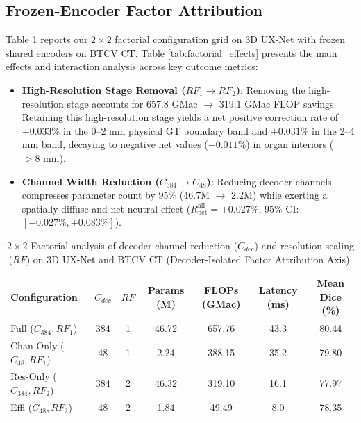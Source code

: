 \subsection{Frozen-Encoder Factor Attribution}
\label{sec:results_factorial}

Table \ref{tab:factorial} reports our $2\times2$ factorial configuration grid on 3D UX-Net with frozen shared encoders on BTCV CT. Table \ref{tab:factorial_effects} presents the main effects and interaction analysis across key outcome metrics:
\begin{itemize}
    \item \textbf{High-Resolution Stage Removal ($RF_1 \rightarrow RF_2$)}: Removing the high-resolution stage accounts for 657.8 GMac $\rightarrow$ 319.1 GMac FLOP savings. Retaining this high-resolution stage yields a net positive correction rate of $+0.033\%$ in the 0--2 mm physical GT boundary band and $+0.031\%$ in the 2--4 mm band, decaying to negative net values ($-0.011\%$) in organ interiors ($>8\text{ mm}$).
    \item \textbf{Channel Width Reduction ($C_{384} \rightarrow C_{48}$)}: Reducing decoder channels compresses parameter count by $95\%$ (46.7M $\rightarrow$ 2.2M) while exerting a spatially diffuse and net-neutral effect ($R_{\text{net}}^{\text{all}} = +0.027\%$, 95\% CI: $[-0.027\%, +0.083\%]$).
\end{itemize}

\begin{table}[t]
\centering
\caption{$2\times2$ Factorial analysis of decoder channel reduction ($C_{dec}$) and resolution scaling ($RF$) on 3D UX-Net and BTCV CT (Decoder-Isolated Factor Attribution Axis).}
\label{tab:factorial}
\small
\begin{tabular*}{\textwidth}{@{\extracolsep{\fill}}lcccccc}
\toprule
\textbf{Configuration} & $C_{dec}$ & $RF$ & \textbf{Params (M)} & \textbf{FLOPs (GMac)} & \textbf{Latency (ms)} & \textbf{Mean Dice (\%)} \\
\midrule
Full ($C_{384}, RF_1$) & 384 & 1 & 46.72 & 657.76 & 43.3 & 80.44 \\
Chan-Only ($C_{48}, RF_1$) & 48 & 1 & 2.24 & 388.15 & 35.2 & 79.80 \\
Res-Only ($C_{384}, RF_2$) & 384 & 2 & 46.32 & 319.10 & 16.1 & 77.97 \\
Effi ($C_{48}, RF_2$) & 48 & 2 & 1.84 & 49.49 & 8.0 & 78.35 \\
\bottomrule
\end{tabular*}
\end{table}

